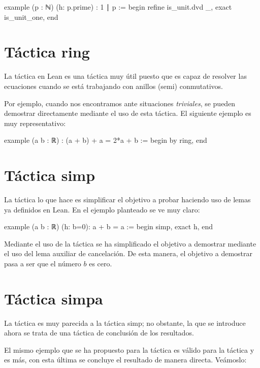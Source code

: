 \begin{leancode}
example (p : ℕ) (h: p.prime) : 1 ∣ p :=
begin
  refine is_unit.dvd _,
  exact is_unit_one,
end
\end{leancode}

\section{Táctica ring}

La táctica  en Lean es una táctica muy útil puesto
que es capaz de resolver las ecuaciones cuando se está trabajando con
anillos (semi) conmutativos.

Por ejemplo, cuando nos encontramos ante situaciones \textit{triviales},
se pueden demostrar directamente mediante el uso de esta táctica. El
siguiente ejemplo es muy representativo:

\begin{leancode}
example (a b : ℝ) : (a + b) + a = 2*a + b :=
begin
  by ring,
end
\end{leancode}

\section{Táctica simp}

La táctica  lo que hace es simplificar el objetivo
a probar haciendo uso de lemas ya definidos en Lean. En el ejemplo
planteado se ve muy claro:
\begin{leancode}
example (a b : ℝ) (h: b=0): a + b = a :=
begin
  simp,
  exact h,
end
\end{leancode}

Mediante el uso de la táctica  se ha simplificado
el objetivo a demostrar mediante el uso del lema auxiliar de
cancelación. De esta manera, el objetivo a demostrar pasa a ser que el
número \(b\) es cero.

\section{Táctica simpa}

La táctica  es muy parecida a la táctica
 {simp}; no obstante, la que se introduce ahora se trata
de una táctica de conclusión de los resultados.

El mismo ejemplo que se ha propuesto para la táctica
 es válido para la táctica 
y es más, con esta última se concluye el resultado de manera
directa. Veámoslo:

